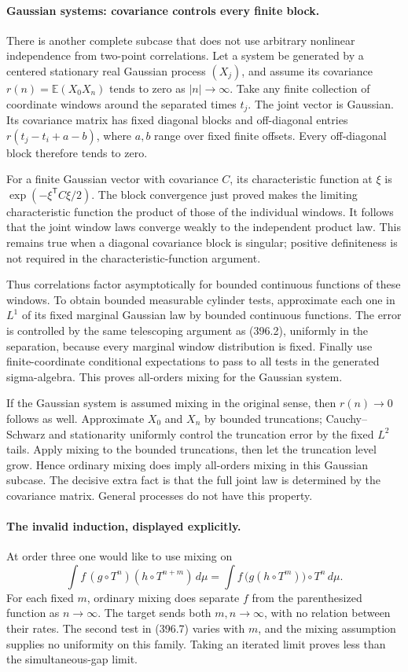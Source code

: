\documentclass[11pt]{article}
\begin{document}
\paragraph{Gaussian systems: covariance controls every finite block.}
There is another complete subcase that does not use arbitrary
nonlinear independence from two-point correlations. Let a system be
generated by a centered stationary real Gaussian process $(X_j)$,
and assume its covariance $r(n)=\mathbb E(X_0X_n)$ tends to zero
as $|n|\to\infty$. Take any finite collection of coordinate windows
around the separated times $t_j$. The joint vector is Gaussian.
Its covariance matrix has fixed diagonal blocks and off-diagonal
entries $r(t_j-t_i+a-b)$, where $a,b$ range over fixed finite offsets.
Every off-diagonal block therefore tends to zero.

For a finite Gaussian vector with covariance $C$, its characteristic
function at $\xi$ is $\exp(-\xi^{\mathsf T}C\xi/2)$. The block
convergence just proved makes the limiting characteristic function
the product of those of the individual windows. It follows that the
joint window laws converge weakly to the independent product law.
This remains true when a diagonal covariance block is singular;
positive definiteness is not required in the characteristic-function
argument.

Thus correlations factor asymptotically for bounded continuous
functions of these windows. To obtain bounded measurable cylinder
tests, approximate each one in $L^1$ of its fixed marginal Gaussian
law by bounded continuous functions. The error is controlled by the
same telescoping argument as (396.2), uniformly in the separation,
because every marginal window distribution is fixed. Finally use
finite-coordinate conditional expectations to pass to all tests in
the generated sigma-algebra. This proves all-orders mixing for the
Gaussian system.

If the Gaussian system is assumed mixing in the original sense,
then $r(n)\to0$ follows as well. Approximate $X_0$ and $X_n$ by
bounded truncations; Cauchy--Schwarz and stationarity uniformly control
the truncation error by the fixed $L^2$ tails. Apply mixing to the
bounded truncations, then let the truncation level grow. Hence ordinary
mixing does imply all-orders mixing in this Gaussian subcase.
The decisive extra fact is that the full joint law is determined by
the covariance matrix. General processes do not have this property.

\paragraph{The invalid induction, displayed explicitly.}
At order three one would like to use mixing on
\[
 \int f\,(g\circ T^n)(h\circ T^{n+m})\,d\mu
 =\int f\,\bigl(g(h\circ T^m)\bigr)\circ T^n\,d\mu.
 \tag{396.7}
\]
For each fixed $m$, ordinary mixing does separate $f$ from the
parenthesized function as $n\to\infty$. The target sends both
$m,n\to\infty$, with no relation between their rates. The second
test in (396.7) varies with $m$, and the mixing assumption supplies
no uniformity on this family. Taking an iterated limit proves less
than the simultaneous-gap limit.
\end{document}
